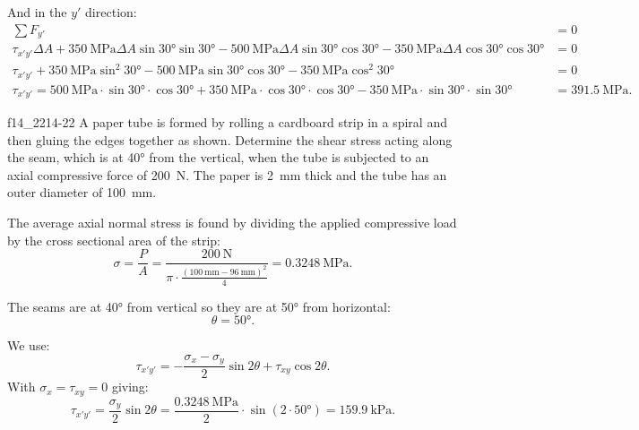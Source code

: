 \begin{derivation}
  And in the $y'$ direction:
  \begin{align*}
    \sum F_{y'} &= 0 \\
    \tau_{x'y'} \Delta A + \qty{350}{\MPa} \Delta A \sin \ang{30} \sin \ang{30} - \qty{500}{\MPa} \Delta A \sin \ang{30} \cos \ang{30} - \qty{350}{\MPa} \Delta A \cos \ang{30} \cos \ang{30} &= 0 \\
    \tau_{x'y'} + \qty{350}{\MPa} \sin^2 \ang{30} - \qty{500}{\MPa} \sin \ang{30} \cos \ang{30} - \qty{350}{\MPa} \cos^2 \ang{30} &= 0 \\
    \tau_{x'y'} = \qty{500}{\MPa} \cdot \sin \ang{30} \cdot \cos \ang{30} + \qty{350}{\MPa} \cdot \cos \ang{30} \cdot \cos \ang{30} - \qty{350}{\MPa} \cdot \sin \ang{30} \cdot \sin \ang{30}  &= \qty{391,5}{\MPa}
  .\end{align*}
\end{derivation}


\begin{problemwithimage}{f14_22}{14-22}
  A paper tube is formed by rolling a cardboard strip in a spiral and then gluing the edges together as shown.
  Determine the shear stress acting along the seam, which is at \ang{40} from the vertical, when the tube is subjected to an axial compressive force of \qty{200}{\N}.
  The paper is \qty{2}{\mm} thick and the tube has an outer diameter of \qty{100}{\mm}.
\end{problemwithimage}

\begin{derivation}
  The average axial normal stress is found by dividing the applied compressive load by the cross sectional area of the strip:
  \begin{equation*}
    \sigma = \frac{P}{A} = \frac{\qty{200}{\N}}{\pi \cdot \frac{\left( \qty{100}{\mm} - \qty{96}{\mm}   \right)^2}{4}} = \qty{0,3248}{\MPa}
  .\end{equation*}
  
  The seams are at \ang{40} from vertical so they are at \ang{50} from horizontal:
  \begin{equation*}
    \theta = \ang{50} 
  .\end{equation*}
  
  We use:
  \begin{equation*}
    \tau_{x'y'} = - \frac{\sigma_x - \sigma_y}{2} \sin 2\theta + \tau_{xy} \cos 2 \theta
  .\end{equation*}
  With $\sigma_x = \tau_{xy} = 0$ giving:
  \begin{equation*}
    \tau_{x'y'} = \frac{\sigma_y}{2} \sin 2 \theta = \frac{\qty{0.3248}{\MPa} }{2} \cdot \sin (2 \cdot \ang{50} ) = \qty{159,9}{\kPa}
  .\end{equation*}
\end{derivation}

